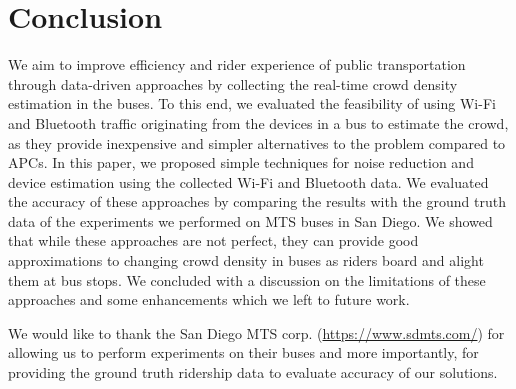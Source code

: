 \section{Conclusion}
\label{sec:conclusion}

We aim to improve efficiency and rider experience of public transportation through data-driven approaches by collecting the real-time crowd density estimation in the buses. To this end, we evaluated the feasibility of using Wi-Fi and Bluetooth traffic originating from the devices in a bus to estimate the crowd, as they provide inexpensive and simpler alternatives to the problem compared to APCs. In this paper, we proposed simple techniques for noise reduction and device estimation using the collected Wi-Fi and Bluetooth data. We evaluated the accuracy of these approaches by comparing the results with the ground truth data of the experiments we performed on MTS buses in San Diego. We showed that while these approaches are not perfect, they can provide good approximations to changing crowd density in buses as riders board and alight them at bus stops. We concluded with a discussion on the limitations of these approaches and some enhancements which we left to future work.



\begin{acks}
  We would like to thank the San Diego MTS corp. (\href{https://www.sdmts.com/}{https://www.sdmts.com/}) for allowing us to perform experiments on their buses and more importantly, for providing the ground truth ridership data to evaluate accuracy of our solutions.
\end{acks}